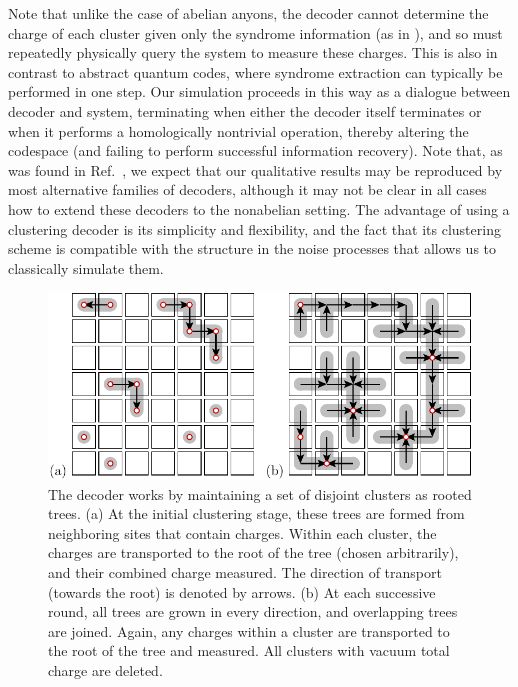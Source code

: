 \documentclass[aps, prl, letterpaper, twocolumn, superscriptaddress, notitlepage, 10pt]{revtex4-1}
\begin{document}
Note that unlike the case of abelian anyons, the decoder
cannot determine the charge of each cluster given only the syndrome information (as in \cite{Bravyi2011}),
and so must repeatedly physically query the system to measure these charges.
This is also in contrast to abstract quantum codes, where syndrome extraction can typically be performed in one step.
Our simulation proceeds in this way as a dialogue between decoder
and system, terminating when either the decoder itself terminates or 
when it performs a homologically nontrivial operation, thereby altering the 
codespace (and failing to perform successful information recovery).
Note that, as was found in Ref.~\cite{Brell2013}, we expect that 
our qualitative results may be reproduced by most alternative families 
of decoders, although it may not be clear in all cases how to extend these decoders to the nonabelian setting.
The advantage of using a clustering decoder is 
its simplicity and flexibility, and the fact that its clustering 
scheme is compatible with the structure in the noise 
processes that allows us to classically simulate them.

\begin{figure}[t!]
\begin{center}
	\includegraphics[width=1.0\columnwidth]{pic-decode.pdf}
\caption{The decoder works by maintaining a set of disjoint clusters as rooted trees.
(a) At the initial clustering stage, these trees are formed 
from neighboring sites that contain charges. Within each cluster, the 
charges are transported to the root of the tree (chosen 
arbitrarily), and their combined charge measured. The direction of transport 
(towards the root) is denoted by arrows.
(b) At each successive round, all trees are grown in 
every direction, and overlapping trees are joined. Again, any charges 
within a cluster are transported to the root of the 
tree and measured. All clusters with vacuum total charge are deleted.
\label{f:decode}
}
\end{center}
\vspace{-10pt}
\end{figure}
\end{document}
